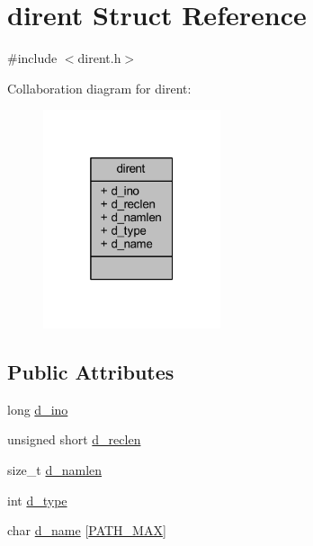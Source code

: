 \hypertarget{structdirent}{\section{dirent Struct Reference}
\label{structdirent}
}


{\ttfamily \#include $<$dirent.\+h$>$}



Collaboration diagram for dirent\+:
\nopagebreak
\begin{figure}[H]
\begin{center}
\leavevmode
\includegraphics[width=148pt]{structdirent__coll__graph}
\end{center}
\end{figure}
\subsection*{Public Attributes}
\begin{DoxyCompactItemize}
\item 
long \hyperlink{structdirent_acb6fecfb0e0f6fdc226dff8d56c3da4a}{d\+\_\+ino}
\item 
unsigned short \hyperlink{structdirent_a90dc47836e8ef510437317876368859e}{d\+\_\+reclen}
\item 
size\+\_\+t \hyperlink{structdirent_a09ced068b03cdb339e34840c8b709621}{d\+\_\+namlen}
\item 
int \hyperlink{structdirent_ad6a736cb04c7295e8f97f708324b3500}{d\+\_\+type}
\item 
char \hyperlink{structdirent_a6c68ac080755453ec52de202e91de59b}{d\+\_\+name} \mbox{[}\hyperlink{dirent_8h_ae688d728e1acdfe5988c7db45d6f0166}{P\+A\+T\+H\+\_\+\+M\+A\+X}\mbox{]}
\end{DoxyCompactItemize}


